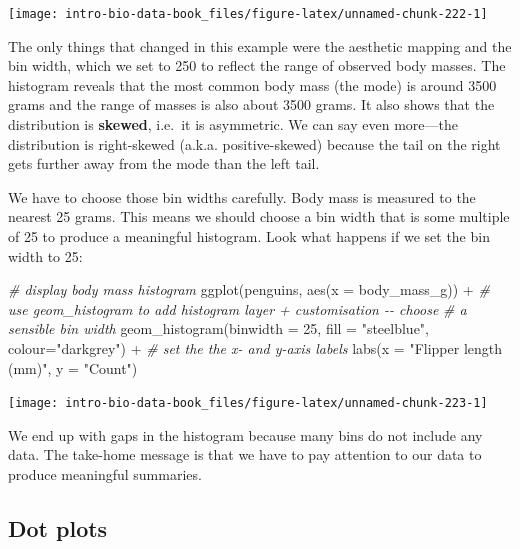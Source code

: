 \documentclass[
]{book}
\newenvironment{Shaded}{\begin{snugshade}}{\end{snugshade}}
\newcommand{\AttributeTok}[1]{\textcolor[rgb]{0.77,0.63,0.00}{#1}}
\newcommand{\CommentTok}[1]{\textcolor[rgb]{0.56,0.35,0.01}{\textit{#1}}}
\newcommand{\DecValTok}[1]{\textcolor[rgb]{0.00,0.00,0.81}{#1}}
\newcommand{\FunctionTok}[1]{\textcolor[rgb]{0.00,0.00,0.00}{#1}}
\newcommand{\NormalTok}[1]{#1}
\newcommand{\SpecialCharTok}[1]{\textcolor[rgb]{0.00,0.00,0.00}{#1}}
\newcommand{\StringTok}[1]{\textcolor[rgb]{0.31,0.60,0.02}{#1}}
\begin{document}
\begin{center}\texttt{[image: intro-bio-data-book\_files/figure-latex/unnamed-chunk-222-1]} \end{center}

The only things that changed in this example were the aesthetic mapping and the bin width, which we set to 250 to reflect the range of observed body masses. The histogram reveals that the most common body mass (the mode) is around 3500 grams and the range of masses is also about 3500 grams. It also shows that the distribution is \textbf{skewed}, i.e.~it is asymmetric. We can say even more---the distribution is right-skewed (a.k.a. positive-skewed) because the tail on the right gets further away from the mode than the left tail.

We have to choose those bin widths carefully. Body mass is measured to the nearest 25 grams. This means we should choose a bin width that is some multiple of 25 to produce a meaningful histogram. Look what happens if we set the bin width to 25:

\begin{Shaded}
\begin{Highlighting}[]
\CommentTok{\# display body mass histogram}
\FunctionTok{ggplot}\NormalTok{(penguins, }\FunctionTok{aes}\NormalTok{(}\AttributeTok{x =}\NormalTok{ body\_mass\_g)) }\SpecialCharTok{+} 
  \CommentTok{\# use geom\_histogram to add histogram layer + customisation {-}{-} choose }
  \CommentTok{\# a sensible bin width}
  \FunctionTok{geom\_histogram}\NormalTok{(}\AttributeTok{binwidth =} \DecValTok{25}\NormalTok{, }\AttributeTok{fill =} \StringTok{"steelblue"}\NormalTok{, }\AttributeTok{colour=}\StringTok{"darkgrey"}\NormalTok{) }\SpecialCharTok{+} 
  \CommentTok{\# set the the x{-} and y{-}axis labels}
  \FunctionTok{labs}\NormalTok{(}\AttributeTok{x =} \StringTok{"Flipper length (mm)"}\NormalTok{, }\AttributeTok{y =} \StringTok{"Count"}\NormalTok{)}
\end{Highlighting}
\end{Shaded}

\begin{center}\texttt{[image: intro-bio-data-book\_files/figure-latex/unnamed-chunk-223-1]} \end{center}

We end up with gaps in the histogram because many bins do not include any data. The take-home message is that we have to pay attention to our data to produce meaningful summaries.

\hypertarget{dot-plots}{%
\subsection{Dot plots}\label{dot-plots}}
\end{document}
